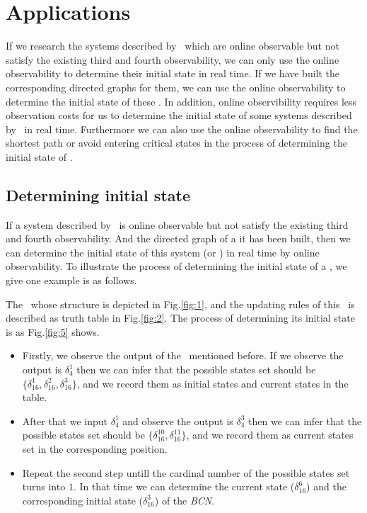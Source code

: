 \section{Applications}
\label{sec:app}
If we research the systems described by \BCNs\ which are online observable but not satisfy the existing third and fourth observability, we can only use the online observability to determine their initial state in real time. If we have built the corresponding directed graphs for them, we can use the online observability to determine the initial state of these \BCNs. In addition, online observibility requires less observation costs for us to determine the initial state of some systems described by  \BCNs\ in real time. Furthermore we can also use the online observability to find the shortest path or avoid entering critical states in the process of determining the initial state of \BCNs. %

\subsection{Determining initial state}

If a system described by \BCN\ is online observable but not satisfy the existing third and fourth observability. And the directed graph of a it has been built, then we can determine the initial state of this system (or \BCN) in real time by online observability. To illustrate the process of determining the initial state of a \BCN, we give one example is as follows.
\begin{example}
The \BCN\ whose structure is depicted in Fig.\ref{fig:1}, and the updating rules of this \BCN\ is described as truth table in Fig.\ref{fig:2}. The process of determining its initial state is as Fig.\ref{fig:5} shows. 
\begin{itemize}
  \item Firstly, we observe the output of the \BCN\ mentioned before. If we observe the output is $\delta_4^1$ then we can infer that the possible states set should be $\{\delta_{16}^1,\delta_{16}^2,\delta_{16}^3\}$, and we record them as initial states and current states in the table. 
  \item After that we input  $\delta_4^1$ and observe the output is $\delta_4^3$ then we can infer that the possible states set should be $\{\delta_{16}^{10},\delta_{16}^{11}\}$, and we record them as current states set in the corresponding position. 
 \item Repeat the second step untill the cardinal number of the possible states set turns into $1$. In that time we can determine the current state ($\delta_{16}^{6}$) and the corresponding initial state  ($\delta_{16}^{3}$) of the {\em BCN}.
\end{itemize} 
\end{example}   

